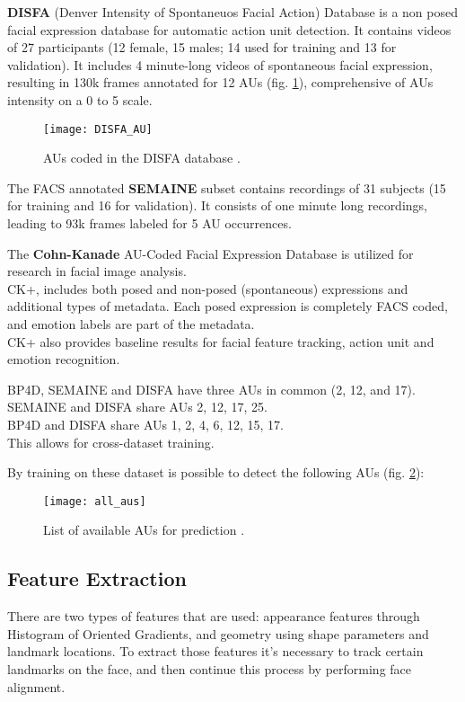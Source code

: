 \textbf{DISFA} (Denver Intensity of Spontaneuos Facial Action) Database is a non posed facial expression database for automatic action unit detection. It contains videos of 27 participants (12 female, 15 males; 14 used for training and 13 for validation). It includes 4 minute-long videos of spontaneous facial expression, resulting in 130k frames annotated for 12 AUs (fig. \ref{fig:DISFA_AU}), comprehensive of AUs intensity on a 0 to 5 scale.

\clearpage

\begin{figure}[H]
	\centering
	\texttt{[image: DISFA\_AU]}
	\caption{AUs coded in the DISFA database \cite{DISFA_AU}.}
	\label{fig:DISFA_AU}
\end{figure}

The FACS annotated \textbf{SEMAINE} subset contains recordings of 31 subjects (15 for training and 16 for validation). It consists of one minute long recordings, leading to 93k frames labeled for 5 AU occurrences.

The \textbf{Cohn-Kanade} AU-Coded Facial Expression Database is utilized for research in facial image analysis. \\
CK+, includes both posed and non-posed (spontaneous) expressions and additional types of metadata. Each posed expression is completely FACS coded, and emotion labels are part of the metadata. \\
CK+ also provides baseline results for facial feature tracking, action unit and emotion recognition.

BP4D, SEMAINE and DISFA have three AUs in common (2, 12, and 17). \\
SEMAINE and DISFA share AUs 2, 12, 17, 25. \\
BP4D and DISFA share AUs 1, 2, 4, 6, 12, 15, 17. \\
This allows for cross-dataset training.

\clearpage

By training on these dataset is possible to detect the following AUs (fig. \ref{fig:all_AUs}):

\begin{figure}[H]
	\centering
	\texttt{[image: all\_aus]}
	\caption{List of available AUs for prediction \cite{Baltru2018}.}
	\label{fig:all_AUs}
\end{figure}

\subsection{Feature Extraction} \label{featExtr}
There are two types of features that are used: appearance features through Histogram of Oriented Gradients, and geometry using shape parameters and landmark locations. To extract those features it's necessary to track certain landmarks on the face, and then continue this process by performing face alignment.

